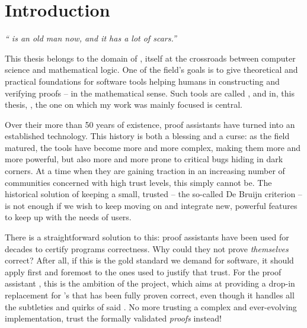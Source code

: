 \chapter{Introduction}
\label{chap:intro-en}

\emph{“ is an old man now, and it has a lot of scars.”}
\vspace{-1.5em}
\begin{flushright}
\end{flushright}

\margintoc[4em]

This thesis belongs to the domain of ,%
itself at the crossroads between computer science and mathematical logic.
One of the field’s goals is to give theoretical and practical foundations
for software tools helping humans in constructing and verifying proofs –
in the mathematical sense.
Such tools are called , and in, this thesis, , the one
on which my work was mainly focused is central.

Over their more than 50 years of existence, proof assistants have
turned into an established technology. This history is both a blessing and a curse: as
the field matured, the tools have become more and more complex, making them more and more
powerful, but also more and more prone to critical bugs hiding in dark corners. At a time
when they are gaining traction in an increasing number of communities
concerned with high trust levels, this simply cannot be.
The historical solution of keeping a small, trusted 
– the so-called De Bruijn criterion –
is not enough if we wish to keep moving on and integrate new, powerful features
to keep up with the needs of users.

There is a straightforward solution to this:
proof assistants have been used for decades to certify programs correctness.
Why could they not prove \emph{themselves} correct? After all, if this is
the gold standard we demand for software, it should apply first and foremost to the ones
used to justify that trust. For the proof assistant ,
this is the ambition of the  project,
which aims at providing a drop-in replacement for ’s  that has been
fully proven correct,
even though it handles all the subtleties and quirks of said .
No more trusting a complex and ever-evolving implementation, trust the formally validated
\emph{proofs} instead!


